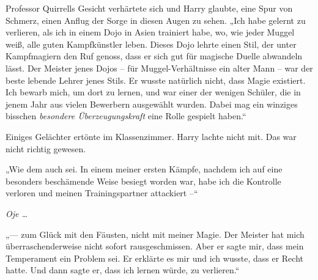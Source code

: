 Professor Quirrells Gesicht verhärtete sich und Harry glaubte, eine Spur von Schmerz, einen Anflug der Sorge in diesen Augen zu sehen. „Ich habe gelernt zu verlieren, als ich in einem Dojo in Asien trainiert habe, wo, wie jeder Muggel weiß, alle guten Kampfkünstler leben. Dieses Dojo lehrte einen Stil, der unter Kampfmagiern den Ruf genoss, dass er sich gut für magische Duelle abwandeln lässt. Der Meister jenes Dojos – für Muggel-Verhältnisse ein alter Mann – war der beste lebende Lehrer jenes Stils. Er wusste natürlich nicht, dass Magie existiert. Ich bewarb mich, um dort zu lernen, und war einer der wenigen Schüler, die in jenem Jahr aus vielen Bewerbern ausgewählt wurden. Dabei mag ein winziges bisschen \emph{besondere Überzeugungskraft} eine Rolle gespielt haben.“

Einiges Gelächter ertönte im Klassenzimmer. Harry lachte nicht mit. Das war nicht richtig gewesen.

„Wie dem auch sei. In einem meiner ersten Kämpfe, nachdem ich auf eine besonders beschämende Weise besiegt worden war, habe ich die Kontrolle verloren und meinen Trainingspartner attackiert –“

\emph{Oje …}

„— zum Glück mit den Fäusten, nicht mit meiner Magie. Der Meister hat mich überraschenderweise nicht sofort rausgeschmissen. Aber er sagte mir, dass mein Temperament ein Problem sei. Er erklärte es mir und ich wusste, dass er Recht hatte. Und dann sagte er, dass ich lernen würde, zu verlieren.“


